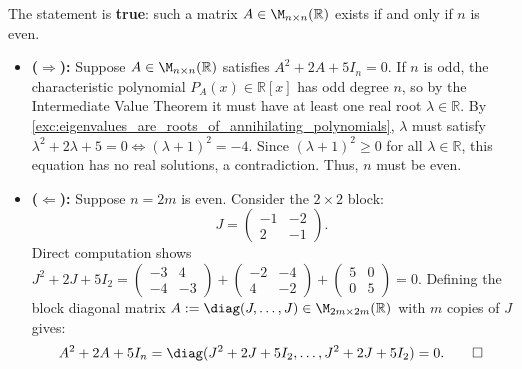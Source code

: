\begin{exercisesolution}
\label{sol:annihilating_quadratic_even_dimension}
The statement is \textbf{true}: such a matrix $A \in \M_{n \times n}(\mathbb{R})$ exists if and only if $n$ is even.
\begin{itemize}
    \item \textbf{($\Rightarrow$):} Suppose $A \in \M_{n \times n}(\mathbb{R})$ satisfies $A^2 + 2A + 5I_n = 0$.
    If $n$ is odd, the characteristic polynomial $P_A(x) \in \mathbb{R}[x]$ has odd degree $n$, so by the Intermediate Value Theorem it must have at least one real root $\lambda \in \mathbb{R}$.
    By \cref{exc:eigenvalues_are_roots_of_annihilating_polynomials}, $\lambda$ must satisfy $\lambda^2 + 2\lambda + 5 = 0 \iff (\lambda + 1)^2 = -4$.
    Since $(\lambda + 1)^2 \ge 0$ for all $\lambda \in \mathbb{R}$, this equation has no real solutions, a contradiction. Thus, $n$ must be even.

    \item \textbf{($\Leftarrow$):} Suppose $n = 2m$ is even. Consider the $2 \times 2$ block:
    \[
    J = \begin{pmatrix} -1 & -2 \\ 2 & -1 \end{pmatrix}.
    \]
    Direct computation shows $J^2 + 2J + 5I_2 = \left(\begin{smallmatrix} -3 & 4 \\ -4 & -3 \end{smallmatrix}\right) + \left(\begin{smallmatrix} -2 & -4 \\ 4 & -2 \end{smallmatrix}\right) + \left(\begin{smallmatrix} 5 & 0 \\ 0 & 5 \end{smallmatrix}\right) = 0$.
    Defining the block diagonal matrix $A := \diag(J, \dots, J) \in \M_{2m \times 2m}(\mathbb{R})$ with $m$ copies of $J$ gives:
    \[
    A^2 + 2A + 5I_n = \diag(J^2 + 2J + 5I_2, \dots, J^2 + 2J + 5I_2) = 0. \qedhere
    \]
\end{itemize}
\end{exercisesolution}

